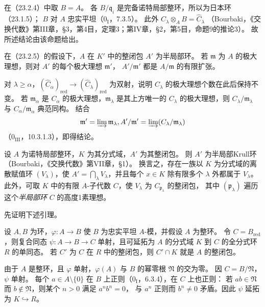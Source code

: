 \eproof
在（23.2.4）中取 $B=\widehat A$。
各 $B/\mathfrak q_i$ 是完备诺特局部整环，所以为日本环（23.1.5）；
$B$ 对 $A$ 忠实平坦（$0_{\mathrm I}$，7.3.5）。
此外 $C_\lambda\otimes_AB=\widehat C_\lambda$
（Bourbaki，《交换代数》第III章，\S3，第4目，定理3；第IV章，\S2，第5目，命题9的推论3）。
故所述结论由该命题给出。
\finishproof

在（23.2.5）的假设下，$A$ 在 $K'$ 中的整闭包 $A'$ 为半局部环。
若 $\mathfrak m$ 为 $A$ 的极大理想，则对 $A'$ 的每个极大理想 $\mathfrak m'$，
$A'/\mathfrak m'$ 都是 $A/\mathfrak m$ 的有限扩张。

\eproof
对 $\lambda\ge\alpha$，$({\widehat C_\alpha})_{\mathrm{red}}
\to({\widehat C_\lambda})_{\mathrm{red}}$ 为双射，说明 $C_\lambda$ 的极大理想个数在此后保持不变。
若 $\mathfrak m_\alpha$ 是 $C_\alpha$ 的极大理想，$\mathfrak m_\lambda$ 是其上方唯一的
$C_\lambda$ 的极大理想，则 $C_\lambda/\mathfrak m_\lambda$ 与
$C_\alpha/\mathfrak m_\alpha$ 典范同构。
结合
\[
 \mathfrak m'=\varinjlim\mathfrak m_\lambda,
 \qquad
 A'/\mathfrak m'=\varinjlim(C_\lambda/\mathfrak m_\lambda)
\]
（$0_{\mathrm{III}}$，10.3.1.3），即得结论。
\finishproof

设 $A$ 为诺特局部整环，$K$ 为其分式域，$A'$ 为其整闭包。
则 $A'$ 为半局部Krull环（Bourbaki，《交换代数》第VII章，\S1）。
换言之，存在一族以 $K$ 为分式域的离散赋值环 $(V_\lambda)$，使
$A'=\bigcap_\lambda V_\lambda$，并且每个 $x\in K$ 除有限多个 $\lambda$ 外都属于 $V_\lambda$。
此外，可取 $K$ 中的有限 $A$-子代数 $C$，使 $V_\lambda$ 为 $C_{\mathfrak p_\lambda}$ 的整闭包，
其中 $(\mathfrak p_\lambda)$ 遍历这个\emph{半局部环} $C$ 的高度1素理想。

先证明下述引理。

设 $A,B$ 为环，$\varphi:A\to B$ 使 $B$ 为忠实平坦 $A$-模，并假设 $A$ 为整环。
令 $C=B_{\mathrm{red}}$，则复合同态 $\psi:A\to B\to C$ 单射，且可延拓为
$A$ 的分式域 $K$ 到 $C$ 的全分式环 $R$ 的单同态。
若 $C'$ 为 $C$ 在 $R$ 中的整闭包，则 $C'\cap K$ 就是 $A$ 的整闭包。

\eproof
由于 $A$ 是整环，且 $\varphi$ 单射，$\varphi(A)$ 与 $B$ 的幂零根 $\mathfrak N$ 的交为零。
因 $C=B/\mathfrak N$，$\psi$ 单射。
每个 $a\in A\setminus\{0\}$ 在 $B$ 上正则（$0_{\mathrm I}$，6.3.4），在 $C$ 上也正则：
若 $ab\in\mathfrak N$ 而 $b\notin\mathfrak N$，则某个 $n>0$ 满足 $a^nb^n=0$，
与 $a^n$ 正则而 $b^n\ne0$ 矛盾。因此 $\psi$ 延拓为 $K\hookrightarrow R$。

